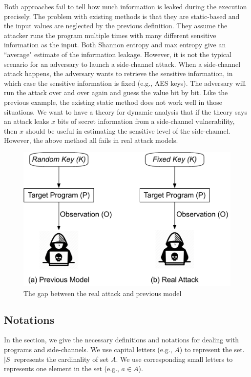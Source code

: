 Both approaches fail to tell how 
much information is leaked during the execution precisely.
The problem with existing methods is that they are static-based and the 
input values are neglected by the previous definition. 
They assume the attacker runs the program multiple times with many different sensitive 
information as the input. Both Shannon entropy and max entropy give an ``average" 
estimate of the information leakage. However, it is not the typical scenario for an adversary to 
launch a side-channel attack. When a side-channel attack happens, the adversary wants 
to retrieve the sensitive information, in which case the sensitive information is fixed (e.g., AES keys). 
The adversary will run the attack over and over again and guess the value bit by bit. Like the 
previous example, the existing static method does not work well in those situations.
We want to have a theory for dynamic analysis that if the theory says 
an attack leaks $x$ bits of secret information from a side-channel vulnerability,
then $x$ should be useful in estimating the sensitive level of the side-channel.
However, the above method all fails in real attack models.
\begin{figure}
  \centering
   \includegraphics[width=.8\columnwidth]{./figures/RA.pdf}
   \caption{The gap between the real attack and previous model}
\end{figure}


\subsection{Notations}
In the section, we give the necessary definitions and notations for dealing 
with programs and side-channels. We use capital letters (e.g., $A$) to represent 
the set. $|S|$ represents the cardinality of set $A$. We use corresponding small letters
to represents one element in the set (e.g., $a \in A$).

